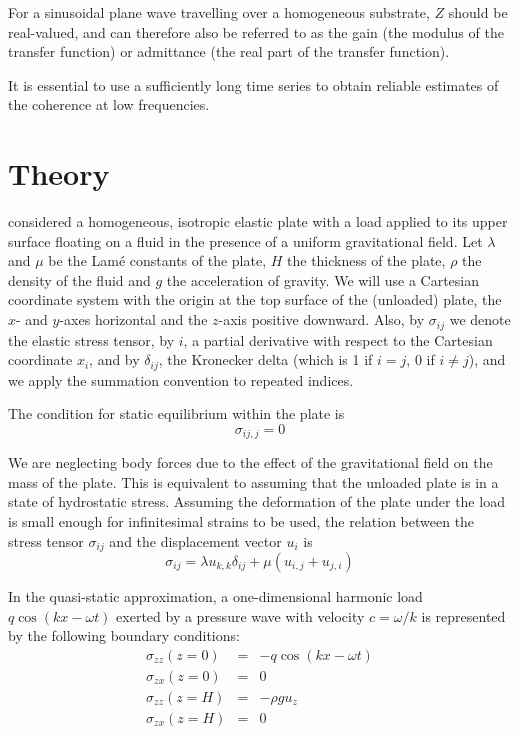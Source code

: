 For a sinusoidal plane wave travelling over a homogeneous substrate, $Z$ should be real-valued, and can therefore also be referred to as the gain (the modulus of the transfer function) or admittance (the real part of the transfer function).










It is essential to use a sufficiently long time series to obtain reliable estimates of the coherence at low frequencies.



\section{Theory}
\cite{Comer1983} considered a homogeneous, isotropic elastic plate with a load applied to its upper surface floating on a fluid in the presence of a uniform gravitational field. Let $\lambda$ and $\mu$ be the Lam\'{e} constants of the plate, $H$ the thickness of the plate, $\rho$ the density of the fluid and $g$ the acceleration of gravity. We will use a Cartesian coordinate system with the origin at the top surface of the (unloaded) plate, the $x$- and $y$-axes horizontal and the $z$-axis positive downward. Also, by $\sigma_{ij}$ we denote the elastic stress tensor, by $i$, a partial derivative with respect to the Cartesian coordinate $x_i$, and by $\delta_{ij}$, the Kronecker delta (which is 1 if $i = j$, 0 if $i \neq j$), and we apply the summation convention to repeated indices.

The condition for static equilibrium within the plate is
\begin{equation}
  \sigma_{ij,j} = 0
\end{equation}

We are neglecting body forces due to the effect of the gravitational field on the mass of the plate. This is equivalent to assuming that the unloaded plate is in a state of hydrostatic stress. Assuming the deformation of the plate under the load is small enough for infinitesimal strains to be used, the relation between the stress tensor $\sigma_{ij}$ and the displacement vector $u_i$ is
\begin{equation}
  \sigma_{ij} = \lambda u_{k,k} \delta_{ij} + \mu(u_{i,j} + u_{j,i})
\end{equation}

In the quasi-static approximation, a one-dimensional harmonic load $q \cos (kx - \omega t)$ exerted by a pressure wave with velocity $c = \omega/k$ is represented by the following boundary conditions:
\begin{eqnarray}
\sigma_{zz} (z=0) &=& -q \cos (kx - \omega t) \\
\sigma_{zx} (z=0) &=& 0 \\
\sigma_{zz} (z=H) &=& -\rho g u_z \\
\sigma_{zx} (z=H) &=& 0
\end{eqnarray}

